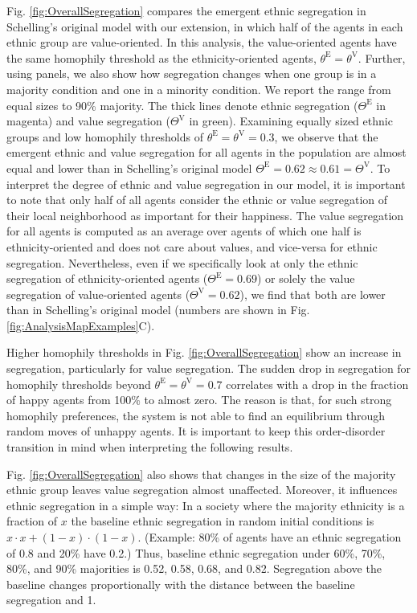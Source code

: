\documentclass{ws-acs}
\begin{document}
{Fig. \ref{fig:OverallSegregation} compares the emergent ethnic segregation in Schelling's original model with our extension, in which half of the agents in each ethnic group are value-oriented. In this analysis, the value-oriented agents have the same homophily threshold as the ethnicity-oriented agents, $\theta^\text{E} = \theta^\text{V}$. Further, using panels, we also show how segregation changes when one group is in a majority condition and one in a minority condition. We report the range from equal sizes to  90\% majority. The thick lines denote ethnic segregation ($\Theta^\text{E}$ in magenta) and value segregation ($\Theta^\text{V}$ in green). Examining equally sized ethnic groups and low homophily thresholds of $\theta^\text{E} = \theta^\text{V} = 0.3$, we observe that the emergent ethnic and value segregation for all agents in the population are almost equal and lower than in Schelling's original model $\Theta^\text{E} = 0.62 ≈ 0.61 = \Theta^\text{V}$. To interpret the degree of ethnic and value segregation in our model, it is important to note that only half of all agents consider the ethnic or value segregation of their local neighborhood as important for their happiness. The value segregation for all
agents is computed as an average over agents of which one half is ethnicity-oriented and does not care about values, and vice-versa for ethnic segregation. Nevertheless, even if we specifically look at only the ethnic segregation of ethnicity-oriented agents ($\Theta^\text{E} = 0.69$) or solely the value segregation of value-oriented agents ($\Theta^\text{V} = 0.62$), we find that both are lower than in Schelling's original model (numbers are shown in Fig. \ref{fig:AnalysisMapExamples}C). 

Higher homophily thresholds in Fig. \ref{fig:OverallSegregation} show an increase in segregation, particularly for value segregation. The sudden drop in segregation for homophily thresholds beyond $\theta^\text{E} = \theta^\text{V} = 0.7$ correlates with a drop in the fraction of happy agents from 100\% to almost zero. The reason is that, for such strong homophily preferences, the system is not able to find an equilibrium through random moves of unhappy agents. It is important to keep this order-disorder transition in mind when interpreting the following results. 

Fig. \ref{fig:OverallSegregation} also shows that changes in the size of the majority ethnic group leaves value segregation almost unaffected. Moreover, it influences ethnic segregation in a simple way: In a society where the majority ethnicity is a fraction of $x$ the baseline ethnic segregation in random initial conditions is $x\cdot x + (1-x)\cdot (1-x)$. (Example: 80\% of agents have an ethnic segregation of 0.8 and 20\% have 0.2.) Thus, baseline ethnic segregation under 60\%, 70\%, 80\%, and 90\% majorities is 0.52, 0.58, 0.68, and 0.82. Segregation above the baseline changes proportionally with the distance between the baseline segregation and 1.

}
\end{document}
